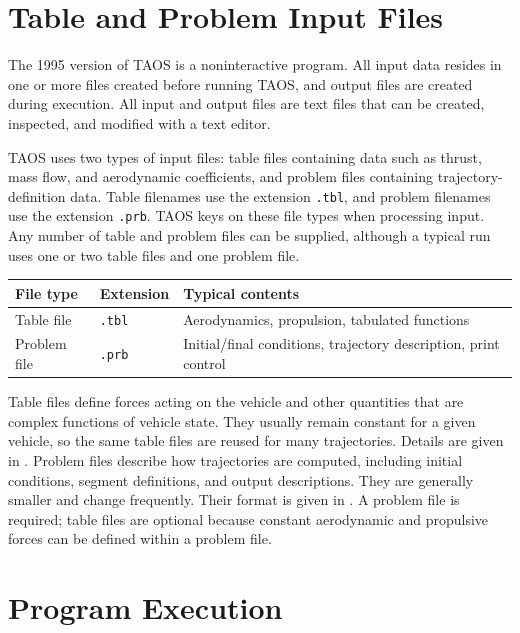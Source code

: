 \section{Table and Problem Input Files}\label{sec:input-files}

The 1995 version of TAOS is a noninteractive program. All input data resides in one
or more files created before running TAOS, and output files are created during
execution. All input and output files are text files that can be created, inspected, and
modified with a text editor.

TAOS uses two types of input files: table files containing data such as thrust, mass
flow, and aerodynamic coefficients, and problem files containing trajectory-definition
data. Table filenames use the extension \texttt{.tbl}, and problem filenames use the
extension \texttt{.prb}. TAOS keys on these file types when processing input. Any
number of table and problem files can be supplied, although a typical run uses one or
two table files and one problem file.

\begin{center}
\begin{tabular}{lll}
\toprule
File type & Extension & Typical contents \\
\midrule
Table file & \texttt{.tbl} & Aerodynamics, propulsion, tabulated functions \\
Problem file & \texttt{.prb} & Initial/final conditions, trajectory description, print control \\
\bottomrule
\end{tabular}
\end{center}

Table files define forces acting on the vehicle and other quantities that are complex
functions of vehicle state. They usually remain constant for a given vehicle, so the
same table files are reused for many trajectories. Details are given in
. Problem files describe how trajectories are computed,
including initial conditions, segment definitions, and output descriptions. They are
generally smaller and change frequently. Their format is given in
. A problem file is required; table files are optional because
constant aerodynamic and propulsive forces can be defined within a problem file.

\section{Program Execution}\label{sec:program-execution}

